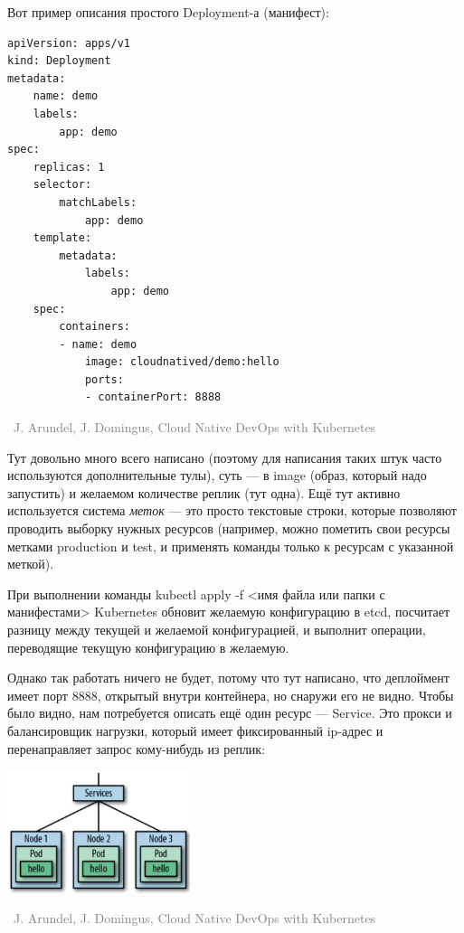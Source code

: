 \documentclass[a5paper]{article}
\newcommand{\attribution}[1] {
    \vspace{-5mm}\begin{flushright}\begin{scriptsize}\textcolor{gray}{\textcopyright\, #1}\end{scriptsize}\end{flushright}
}
\begin{document}
Вот пример описания простого Deployment-а (манифест):

\begin{verbatim}
apiVersion: apps/v1
kind: Deployment
metadata:
    name: demo
    labels:
        app: demo
spec:
    replicas: 1
    selector:
        matchLabels:
            app: demo
    template:
        metadata:
            labels:
                app: demo
    spec:
        containers:
        - name: demo
            image: cloudnatived/demo:hello
            ports:
            - containerPort: 8888
\end{verbatim}

\attribution{J. Arundel, J. Domingus, Cloud Native DevOps with Kubernetes}

Тут довольно много всего написано (поэтому для написания таких штук часто используются дополнительные тулы), суть --- в image (образ, который надо запустить) и желаемом количестве реплик (тут одна). Ещё тут активно используется система \emph{меток} --- это просто текстовые строки, которые позволяют проводить выборку нужных ресурсов (например, можно пометить свои ресурсы метками production и test, и применять команды только к ресурсам с указанной меткой).

При выполнении команды kubectl apply -f <имя файла или папки с манифестами> Kubernetes обновит желаемую конфигурацию в etcd, посчитает разницу между текущей и желаемой конфигурацией, и выполнит операции, переводящие текущую конфигурацию в желаемую.

Однако так работать ничего не будет, потому что тут написано, что деплоймент имеет порт 8888, открытый внутри контейнера, но снаружи его не видно. Чтобы было видно, нам потребуется описать ещё один ресурс --- Service. Это прокси и балансировщик нагрузки, который имеет фиксированный ip-адрес и перенаправляет запрос кому-нибудь из реплик:

\begin{center}
    \includegraphics[width=0.4\textwidth]{kubernetesServices.png}
    \attribution{J. Arundel, J. Domingus, Cloud Native DevOps with Kubernetes}
\end{center}
\end{document}
